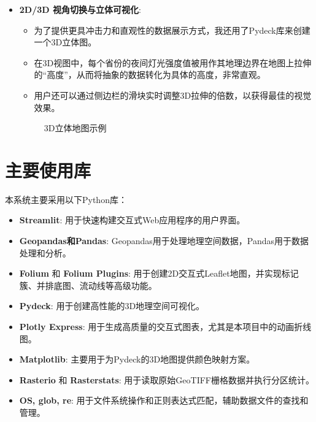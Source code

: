 \documentclass[14pt,a4paper,UTF8,twoside]{article}
\begin{document}
\begin{itemize}
    \item \textbf{2D/3D 视角切换与立体可视化}:
    \begin{itemize}
        \item 为了提供更具冲击力和直观性的数据展示方式，我还用了Pydeck库来创建一个3D立体图。
        \item 在3D视图中，每个省份的夜间灯光强度值被用作其地理边界在地图上拉伸的“高度”，从而将抽象的数据转化为具体的高度，非常直观。
        \item 用户还可以通过侧边栏的滑块实时调整3D拉伸的倍数，以获得最佳的视觉效果。
    \end{itemize}
    \begin{figure}[H]
        \centering
        \caption{3D立体地图示例}
        \label{fig:3d_map_example}
    \end{figure}

\end{itemize}

\section{主要使用库}
本系统主要采用以下Python库：
\begin{itemize}
    \item \textbf{Streamlit}: 用于快速构建交互式Web应用程序的用户界面。
    \item \textbf{Geopandas和Pandas}: Geopandas用于处理地理空间数据，Pandas用于数据处理和分析。
    \item \textbf{Folium} 和 \textbf{Folium Plugins}: 用于创建2D交互式Leaflet地图，并实现标记簇、并排底图、流动线等高级功能。
    \item \textbf{Pydeck}: 用于创建高性能的3D地理空间可视化。
    \item \textbf{Plotly Express}: 用于生成高质量的交互式图表，尤其是本项目中的动画折线图。
    \item \textbf{Matplotlib}: 主要用于为Pydeck的3D地图提供颜色映射方案。
    \item \textbf{Rasterio} 和 \textbf{Rasterstats}: 用于读取原始GeoTIFF栅格数据并执行分区统计。
    \item \textbf{OS, glob, re}: 用于文件系统操作和正则表达式匹配，辅助数据文件的查找和管理。
\end{itemize}
\end{document}

